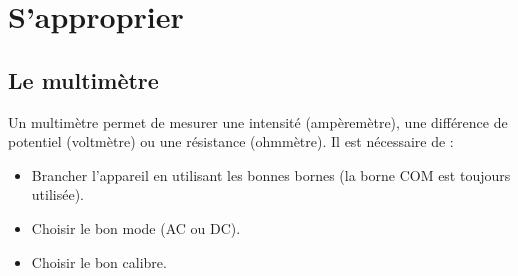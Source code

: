 \documentclass[../main/main.tex]{subfiles}
\begin{document}
\section{S'approprier}
\subsection{Le multimètre}

Un multimètre permet de mesurer une intensité (ampèremètre), une différence de
potentiel (voltmètre) ou une résistance (ohmmètre). Il est nécessaire de :
\begin{itemize}
	\item Brancher l'appareil en utilisant les bonnes bornes (la borne COM est
	      toujours utilisée).
	\item Choisir le bon mode (AC ou DC).
	\item Choisir le bon calibre.
\end{itemize}
\end{document}
